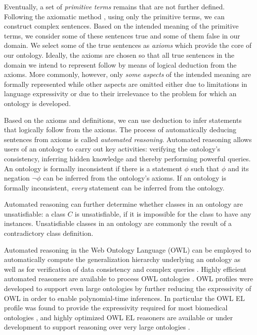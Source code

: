 \documentclass[11pt]{article}
\renewcommand{\cite}{\citep}
\begin{document}
Eventually, a set of {\em primitive terms} remains that are not
further defined. Following the axiomatic method \cite{Hilbert1918},
using only the primitive terms, we can construct complex
sentences. Based on the intended meaning of the primitive terms, we
consider some of these sentences true and some of them false in our
domain. We select some of the true sentences as {\em axioms} which
provide the core of our ontology. Ideally, the axioms are chosen so
that all true sentences in the domain we intend to represent follow by
means of logical deduction from the axioms. More commonly, however,
only {\em some aspects} of the intended meaning are formally
represented while other aspects are omitted either due to limitations
in language expressivity or due to their irrelevance to the problem
for which an ontology is developed.

Based on the axioms and definitions, we can use deduction to infer
statements that logically follow from the axioms.  The process of
automatically deducing sentences from axioms is called {\em automated
  reasoning}. Automated reasoning allows users of an ontology to carry
out key activities: verifying the ontology's consistency, inferring
hidden knowledge and thereby performing powerful queries.  An ontology
is formally inconsistent if there is a statement $\phi$ such that
$\phi$ and its negation $\neg \phi$ can be inferred from the
ontology's axioms.  If an ontology is formally inconsistent, {\em
  every} statement can be inferred from the ontology.  

Automated reasoning can further determine whether classes in an
ontology are unsatisfiable: a class $C$ is unsatisfiable, if it is
impossible for the class to have any instances. Unsatisfiable classes
in an ontology are commonly the result of a contradictory class
definition. %

Automated reasoning in the Web Ontology Language (OWL) can be employed
to automatically compute the generalization hierarchy underlying an
ontology as well as for verification of data consistency and complex
queries \cite{Hoehndorf2011incon, Hoehndorf2011models}. Highly
efficient automated reasoners are available to process OWL ontologies
\cite{Sirin2004, Tsarkov2006, Motik2009a}. OWL profiles were developed
to support even large ontologies by further reducing the expressivity
of OWL in order to enable polynomial-time inferences. In particular
the OWL EL profile was found to provide the expressivity required for
most biomedical ontologies \cite{el4, elvira}, and highly optimized
OWL EL reasoners are available or under development to support
reasoning over very large ontologies \cite{el4, cbreasoner}.
\end{document}
